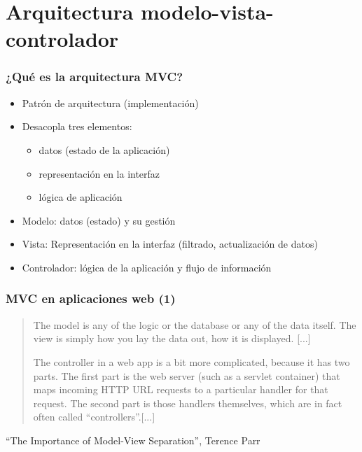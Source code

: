 %


\section{Arquitectura modelo-vista-controlador}


\begin{frame}
\frametitle{¿Qué es la arquitectura MVC?}


\begin{itemize}
\item Patrón de arquitectura (implementación)
\item Desacopla tres elementos:
  \begin{itemize}
  \item datos (estado de la aplicación)
  \item representación en la interfaz
  \item lógica de aplicación
  \end{itemize}
\item Modelo: datos (estado) y su gestión
\item Vista: Representación en la interfaz (filtrado, actualización de datos)
\item Controlador: lógica de la aplicación y flujo de información
\end{itemize}

\end{frame}


\begin{frame}
\frametitle{MVC en aplicaciones web (1)}

\begin{quotation}
The model is any of the logic or the database or any of the data itself. The view is simply how you lay the data out, how it is displayed. [...]

The controller in a web app is a bit more complicated, because it has two parts. The first part is the web server (such as a servlet container) that maps incoming HTTP URL requests to a particular handler for that request. The second part is those handlers themselves, which are in fact often called ``controllers''.[...]
\end{quotation}

\begin{flushright}
``The Importance of Model-View Separation'', Terence Parr \\
\end{flushright}

\end{frame}

